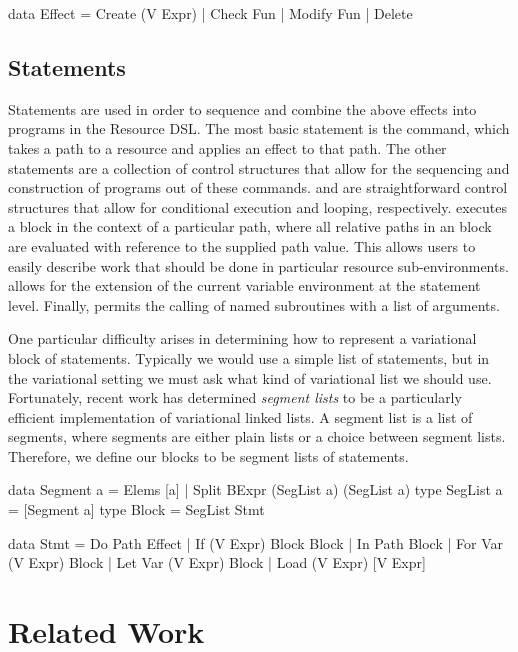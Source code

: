 \documentclass[onehalf,11pt]{beavtex}
\begin{document}
\begin{program}
data Effect
     = Create (V Expr)
     | Check  Fun
     | Modify Fun
     | Delete
\end{program}

\section{Statements}

Statements are used in order to sequence and combine the above effects into programs in the Resource DSL.
The most basic statement is the  command, which takes a path to a resource and applies an effect to that
path. The other statements are a collection of control structures that allow for the sequencing and construction of
programs out of these  commands.  and  are straightforward control structures that allow
for conditional execution and looping, respectively.  executes a block in the context of a particular path, where all
relative paths in an  block are evaluated with reference to the supplied path value. This allows
users to easily describe work that should be done in particular resource sub-environments.  allows for the
extension of the current variable environment at the statement level. Finally,  permits the calling of named
subroutines with a list of arguments. 

One particular difficulty arises in determining how to represent a variational block of statements. Typically we
would use a simple list of statements, but in the variational setting we must ask what kind of variational list
we should use. Fortunately, recent work \cite{lists} has determined \emph{segment lists} to be a particularly
efficient implementation of variational linked lists. A segment list is a list of segments, where segments are either
plain lists or a choice between segment lists. Therefore, we define our blocks to be segment lists of
statements.

\begin{program}
data Segment a = Elems [a] | Split BExpr (SegList a) (SegList a)
type SegList a = [Segment a]
type Block = SegList Stmt

data Stmt
     = Do Path Effect
     | If (V Expr) Block Block
     | In Path Block
     | For Var (V Expr) Block
     | Let Var (V Expr) Block
     | Load (V Expr) [V Expr]
\end{program}

\chapter{Related Work}
\label{ch:rw}
\end{document}
